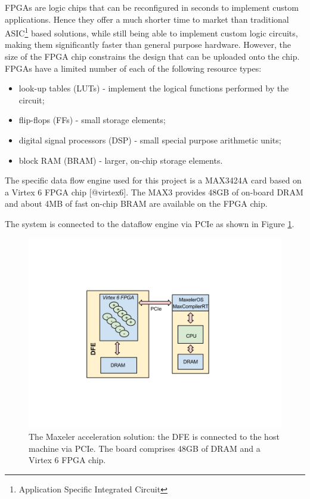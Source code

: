 FPGAs are logic chips that can be reconfigured in seconds to implement
custom applications. Hence they offer a much shorter time to market
than traditional ASIC\footnote{Application Specific Integrated
  Circuit} based solutions, while still being able to implement custom
logic circuits, making them significantly faster than general purpose
hardware. However, the size of the FPGA chip constrains the design
that can be uploaded onto the chip. FPGAs have a limited number of
each of the following resource types:



\begin{itemize}
\item look-up tables (LUTs) - implement the logical functions performed by the circuit;
\item flip-flops (FFs) - small storage elements;
\item digital signal processors (DSP) - small special purpose arithmetic units;
\item block RAM (BRAM) - larger, on-chip storage elements.
\end{itemize}



The specific data flow engine used for this project is a MAX3424A card
based on a Virtex 6 FPGA chip [@virtex6]. The MAX3 provides 48GB of
on-board DRAM and about 4MB of fast on-chip BRAM are available on the
FPGA chip.

The system is connected to the dataflow engine via PCIe as shown in
Figure \ref{fig:max3}.

\begin{figure}[h]
\centering
\includegraphics[scale=0.4, trim=0 200 0 200]{figs/max3.png} \caption{
The Maxeler acceleration solution: the DFE is connected to
the host machine via PCIe. The board comprises 48GB of DRAM and a
Virtex 6 FPGA chip. }
\label{fig:max3}
\end{figure}

